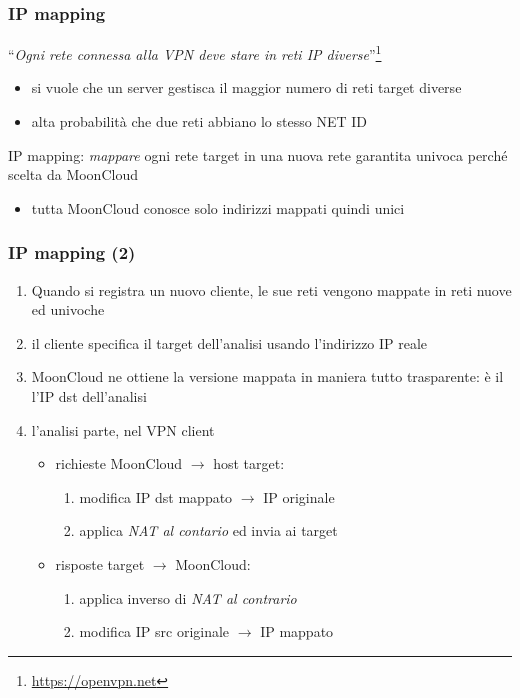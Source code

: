 \begin{frame}
	\frametitle{IP mapping}
	``\textit{Ogni rete connessa alla VPN deve stare in reti IP diverse}''\footnote{\url{https://openvpn.net}}
	\begin{itemize}
		\item si vuole che un server gestisca il maggior numero di reti target diverse
		\item alta probabilità che due reti abbiano lo stesso NET ID
	\end{itemize}
		
	\alert{IP mapping}: \textit{mappare} ogni rete target in una nuova rete
	\alert{garantita univoca} perché scelta da MoonCloud
	\begin{itemize}
		\item tutta MoonCloud conosce solo indirizzi mappati quindi unici
	\end{itemize}
\end{frame}

\begin{frame}
	\frametitle{IP mapping (2)}
	\begin{enumerate}
		\item Quando si registra un nuovo cliente, le sue reti vengono \alert{mappate}
		      in reti nuove ed univoche
		      		      
		\item il cliente specifica il target dell'analisi usando l'indirizzo IP reale
		      		              
		\item MoonCloud ne ottiene la \alert{versione mappata} in maniera tutto
		      \alert{trasparente}: è il l'IP dst dell'analisi
		      		      
		\item l'analisi parte, nel \alert{VPN client}
		      \begin{itemize}
		      	\item richieste MoonCloud $\rightarrow$ host target:
		      	      \begin{enumerate}
		      	      	\item modifica IP dst mappato $\rightarrow$ IP originale
		      	      	\item applica \textit{NAT al contario} ed invia ai target
		      	      \end{enumerate}
		      	\item risposte target $\rightarrow$ MoonCloud:
		      	      \begin{enumerate}
		      	      	\item applica inverso di \textit{NAT al contrario}
		      	      	\item modifica IP src originale $\rightarrow$ IP mappato
		      	      \end{enumerate}
		      \end{itemize}
		      		      
	\end{enumerate}
		
\end{frame}


